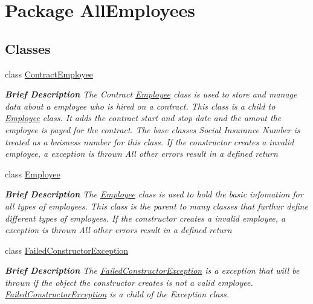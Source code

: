 \hypertarget{namespace_all_employees}{}\section{Package All\+Employees}
\label{namespace_all_employees}
\subsection*{Classes}
\begin{DoxyCompactItemize}
\item 
class \hyperlink{class_all_employees_1_1_contract_employee}{Contract\+Employee}
\begin{DoxyCompactList}\small\item\em {\bfseries Brief Description} The Contract \hyperlink{class_all_employees_1_1_employee}{Employee} class is used to store and manage data about a employee who is hired on a contract. This class is a child to \hyperlink{class_all_employees_1_1_employee}{Employee} class. It adds the contract start and stop date and the amout the employee is payed for the contract. The base classes Social Insurance Number is treated as a buisness number for this class. If the constructor creates a invalid employee, a exception is thrown All other errors result in a defined return \end{DoxyCompactList}\item 
class \hyperlink{class_all_employees_1_1_employee}{Employee}
\begin{DoxyCompactList}\small\item\em {\bfseries Brief Description} The \hyperlink{class_all_employees_1_1_employee}{Employee} class is used to hold the basic infomation for all types of employees. This class is the parent to many classes that furthur define different types of employees. If the constructor creates a invalid employee, a exception is thrown All other errors result in a defined return \end{DoxyCompactList}\item 
class \hyperlink{class_all_employees_1_1_failed_constructor_exception}{Failed\+Constructor\+Exception}
\begin{DoxyCompactList}\small\item\em {\bfseries Brief Description} The \hyperlink{class_all_employees_1_1_failed_constructor_exception}{Failed\+Constructor\+Exception} is a exception that will be thrown if the object the constructor creates is not a valid employee. \hyperlink{class_all_employees_1_1_failed_constructor_exception}{Failed\+Constructor\+Exception} is a child of the Exception class. \end{DoxyCompactList}\item 

\end{DoxyCompactItemize}

